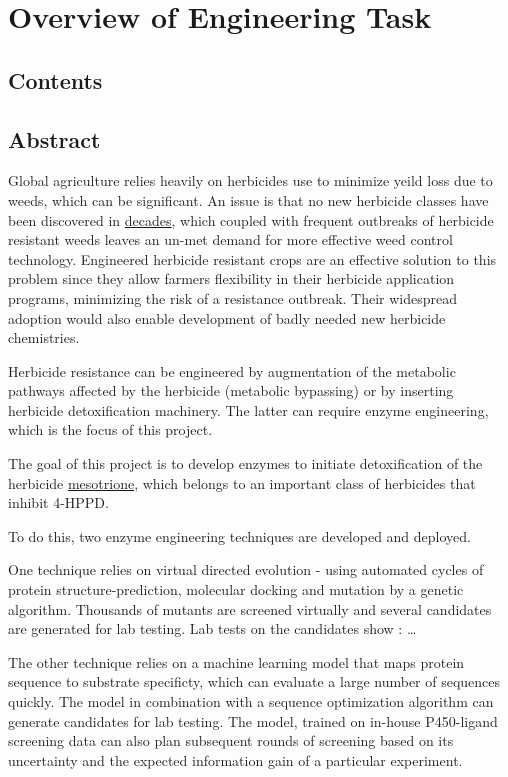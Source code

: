 \hypertarget{overview-of-engineering-task}{%
\section{Overview of Engineering
Task}\label{overview-of-engineering-task}}

\hypertarget{contents}{%
\subsection{Contents}\label{contents}}

\hypertarget{abstract}{%
\subsection{Abstract}\label{abstract}}

Global agriculture relies heavily on herbicides use to minimize yeild
loss due to weeds, which can be significant. An issue is that no new
herbicide classes have been discovered in \href{how\%20long?}{decades},
which coupled with frequent outbreaks of herbicide resistant weeds
leaves an un-met demand for more effective weed control technology.
Engineered herbicide resistant crops are an effective solution to this
problem since they allow farmers flexibility in their herbicide
application programs, minimizing the risk of a resistance outbreak.
Their widespread adoption would also enable development of badly needed
new herbicide chemistries.

Herbicide resistance can be engineered by augmentation of the metabolic
pathways affected by the herbicide (metabolic bypassing) or by inserting
herbicide detoxification machinery. The latter can require enzyme
engineering, which is the focus of this project.

The goal of this project is to develop enzymes to initiate
detoxification of the herbicide
\href{https://pubchem.ncbi.nlm.nih.gov/compound/Mesotrione}{mesotrione},
which belongs to an important class of herbicides that inhibit 4-HPPD.

To do this, two enzyme engineering techniques are developed and
deployed.

One technique relies on virtual directed evolution - using automated
cycles of protein structure-prediction, molecular docking and mutation
by a genetic algorithm. Thousands of mutants are screened virtually and
several candidates are generated for lab testing. Lab tests on the
candidates show : \ldots{}

The other technique relies on a machine learning model that maps protein
sequence to substrate specificty, which can evaluate a large number of
sequences quickly. The model in combination with a sequence optimization
algorithm can generate candidates for lab testing. The model, trained on
in-house P450-ligand screening data can also plan subsequent rounds of
screening based on its uncertainty and the expected information gain of
a particular experiment.

